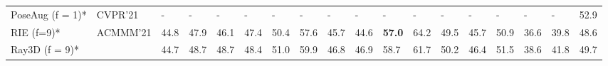 \documentclass[10pt,twocolumn,letterpaper]{article}
\begin{document}
\begin{table*}[htbp]
\begin{tabular}{@{}l|llllllllllllllll|l@{}}
PoseAug (f = 1)* \cite{GongZF21}                  &CVPR'21 & -     & -     & -     & -     & -     & -     & -      & -     & -     & -     & -     & -     & -     & -      & -      & 52.9   \\
RIE (f=9)* \cite{wenkang2021improving}            &ACMMM'21& 44.8  & 47.9  & 46.1  & 47.4  & 50.4  & 57.6  & 45.7   & 44.6  & \textbf{57.0}   & 64.2  & 49.5  & 45.7  & 50.9  & 36.6   & 39.8   & 48.6   \\ \hline
Ray3D (f = 9)*                                    &        & 44.7  & 48.7  & 48.7  & 48.4  & 51.0  & 59.9  & 46.8   & 46.9  & 58.7  & 61.7  & 50.2  & 46.4  & 51.5  & 38.6   & 41.8   & 49.7   \\ \bottomrule
\end{tabular}
\label{table:supp_result_1}
\\
\end{table*}
\end{document}
